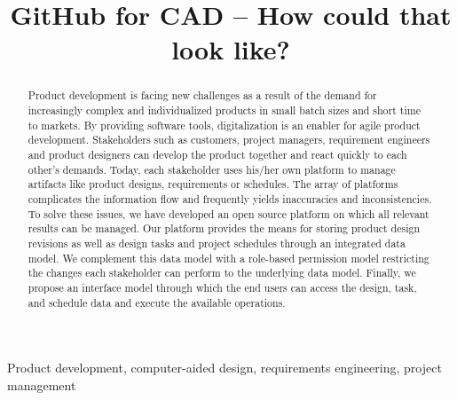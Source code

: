 \title{GitHub for CAD -- How could that look like?}

\author{
    \and
    \and
}

\maketitle

\begin{abstract}
    Product development is facing new challenges as a result of the demand for increasingly complex and individualized products in small batch sizes and short time to markets. 
    By providing software tools, digitalization is an enabler for agile product development.
    Stakeholders such as customers, project managers, requirement engineers and product designers can develop the product together and react quickly to each other's demands.
    Today, each stakeholder uses his/her own platform to manage artifacts like product designs, requirements or schedules.
    The array of platforms complicates the information flow and frequently yields inaccuracies and inconsistencies.
    To solve these issues, we have developed an open source platform on which all relevant results can be managed.
    Our platform provides the means for storing product design revisions as well as design tasks and project schedules through an integrated data model.
    We complement this data model with a role-based permission model restricting the changes each stakeholder can perform to the underlying data model.
    Finally, we propose an interface model through which the end users can access the design, task, and schedule data and execute the available operations.
\end{abstract}

\begin{IEEEkeywords}
    Product development, computer-aided design, requirements engineering, project management
\end{IEEEkeywords}